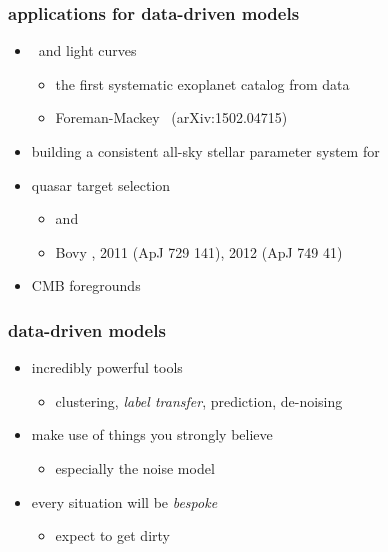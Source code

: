 \documentclass[pdftex]{beamer}
\begin{document}
\begin{frame}
  \frametitle{applications for data-driven models}
  \begin{itemize}
  \item \kepler\ and  light curves
    \begin{itemize}
    \item the first systematic exoplanet catalog from  data
    \item Foreman-Mackey \etal\ (arXiv:1502.04715)
    \end{itemize}
  \item building a consistent all-sky stellar parameter system for \gaia
  \item quasar target selection
    \begin{itemize}
    \item {} and 
    \item Bovy \etal, 2011 (ApJ 729 141), 2012 (ApJ 749 41)
    \end{itemize}
  \item CMB foregrounds
  \end{itemize}
\end{frame}

\begin{frame}
  \frametitle{data-driven models}
  \begin{itemize}
  \item incredibly powerful tools
    \begin{itemize}
    \item clustering, \emph{label transfer}, prediction, de-noising
    \end{itemize}
  \item make use of things you strongly believe
    \begin{itemize}
    \item especially the noise model
    \end{itemize}
  \item every situation will be \emph{bespoke}
    \begin{itemize}
    \item expect to get dirty
    \end{itemize}
  \end{itemize}
\end{frame}
\end{document}
